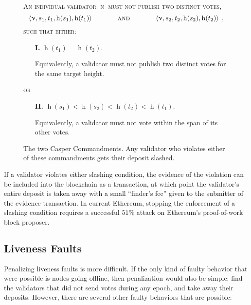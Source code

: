 \documentclass[12pt, final]{article}
\newcommand{\h}{\operatorname{h}\xspace}
\begin{document}
\begin{figure}
\begin{mdframed}
\textsc{An individual validator $\upnu$ must not publish two distinct votes,}
\begin{equation*}
\left\langle \upnu, s_1, t_1, \h(s_1), \h(t_1)\right\rangle \hspace{0.5in} \textsc{and} \hspace{0.5in} \left\langle \upnu, s_2, t_2, \h(s_2), \h(t_2)\right\rangle \; ,
\end{equation*}
\textsc{such that either:}

\begin{enumerate}
   \item[\textbf{I.}] $\h(t_1) = \h(t_2)$.

   Equivalently, a validator must not publish two distinct votes for the same target height.
\end{enumerate}
\vspace{-0.15in}
\textsc{or}

\begin{enumerate}
   \item[\textbf{II.}] $\h(s_1) < \h(s_2) < \h(t_2) < \h(t_1)$.

   Equivalently, a validator must not vote within the span of its other votes.
\end{enumerate}
\end{mdframed}
\caption{The two Casper Commandments.  Any validator who violates either of these commandments gets their deposit slashed.}
\label{fig:commandments}
\end{figure}

If a validator violates either slashing condition, the evidence of the violation can be included into the blockchain as a transaction, at which point the validator's entire deposit is taken away with a small ``finder's fee'' given to the submitter of the evidence transaction. In current Ethereum, stopping the enforcement of a slashing condition requires a successful $51\%$ attack on Ethereum's proof-of-work block proposer.

\subsection{Liveness Faults}

Penalizing liveness faults is more difficult. If the only kind of faulty behavior that were possible is nodes going offline, then penalization would also be simple: find the validators that did not send votes during any epoch, and take away their deposits. However, there are several other faulty behaviors that are possible:
\end{document}
